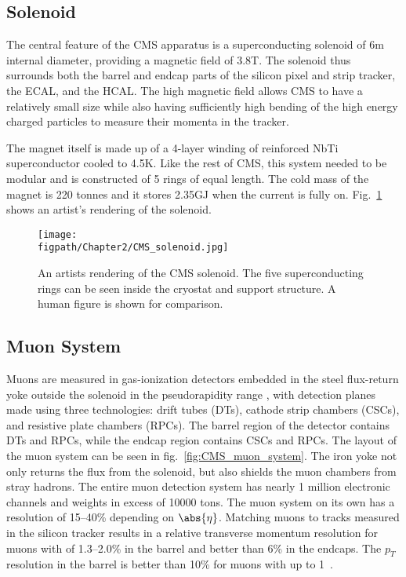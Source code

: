 \subsection{Solenoid}

The central feature of the CMS apparatus is a superconducting solenoid of 6\unit{m} internal diameter, providing a magnetic field of 3.8\unit{T}.
The solenoid thus surrounds both the barrel and endcap parts of the silicon pixel and strip tracker, the ECAL, and the HCAL.
The high magnetic field allows CMS to have a relatively small size while also having sufficiently high bending of the high energy charged particles to measure their momenta in the tracker.

The magnet itself is made up of a 4-layer winding of reinforced NbTi superconductor cooled to 4.5\unit{K}.
Like the rest of CMS, this system needed to be modular and is constructed of 5 rings of equal length.
The cold mass of the magnet is 220 tonnes and it stores 2.35\unit{GJ} when the current is fully on.
Fig.~\ref{fig:CMS_solenoid} shows an artist's rendering of the solenoid.

\begin{figure}[!hbt]
    \centering
    \texttt{[image: \\figpath/Chapter2/CMS\_solenoid.jpg]}
    \caption{An artists rendering of the CMS solenoid. The five superconducting rings can be seen inside the cryostat and support structure. A human figure is shown for comparison.}
    \label{fig:CMS_solenoid}
\end{figure}

\subsection{Muon System}

Muons are measured in gas-ionization detectors embedded in the steel flux-return yoke outside the solenoid in the pseudorapidity range , with detection planes made using three technologies: drift tubes (DTs), cathode strip chambers (CSCs), and resistive plate chambers (RPCs).
The barrel region of the detector contains DTs and RPCs, while the endcap region contains CSCs and RPCs.
The layout of the muon system can be seen in fig.~\ref{fig:CMS_muon_system}.
The iron yoke not only returns the flux from the solenoid, but also shields the muon chambers from stray hadrons.
The entire muon detection system has nearly 1 million electronic channels and weights in excess of 10000 tons.
The muon system on its own has a resolution of 15--40\% depending on $\abs{\eta}$.
Matching muons to tracks measured in the silicon tracker results in a relative transverse momentum resolution for muons with \GeV of 1.3--2.0\% in the barrel and better than 6\% in the endcaps. The $p_{T}$ resolution in the barrel is better than 10\% for muons with \pt up to 1\TeV~\cite{Chatrchyan:2012xi}.

